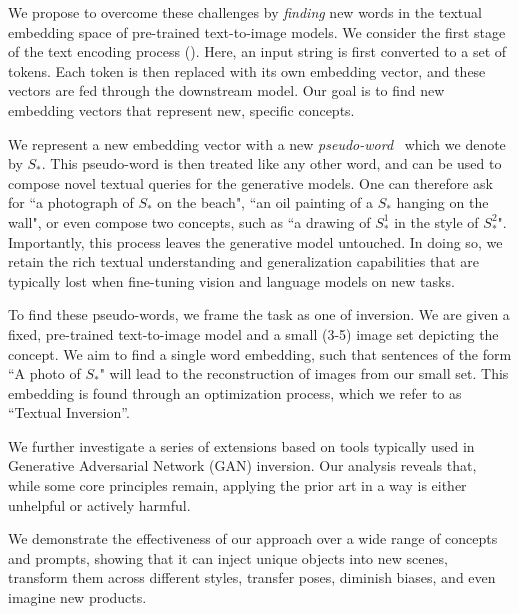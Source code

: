 We propose to overcome these challenges by \textit{finding} new words in the textual embedding space of pre-trained text-to-image models. We consider the first stage of the text encoding process (). Here, an input string is first converted to a set of tokens. Each token is then replaced with its own embedding vector, and these vectors are fed through the downstream model. Our goal is to find new embedding vectors that represent new, specific concepts.

We represent a new embedding vector with a new \textit{pseudo-word}~\citep{rathvon2004early} 
which we denote by $S_*$. This pseudo-word is then treated like any other word, and can be used to compose novel textual queries for the generative models. One can therefore ask for ``a photograph of $S_*$ on the beach", ``an oil painting of a $S_*$ hanging on the wall", or even compose two concepts, such as ``a drawing of $S^1_*$ in the style of $S^2_*$". Importantly, this process leaves the generative model untouched. In doing so, we retain the rich textual understanding and generalization capabilities that are typically lost when fine-tuning vision and language models on new tasks.

To find these pseudo-words, we frame the task as one of inversion. We are given a fixed, pre-trained text-to-image model and a small (3-5) image set depicting the concept. We aim to find a single word embedding, such that sentences of the form ``A photo of $S_*$" will lead to the reconstruction of images from our small set. This embedding is found through an optimization process, which we refer to as ``Textual Inversion''. 

We further investigate a series of extensions based on tools typically used in Generative Adversarial Network (GAN) inversion. Our analysis reveals that, while some core principles remain, applying the prior art in a \naive way is either unhelpful or actively harmful.

We demonstrate the effectiveness of our approach over a wide range of concepts and prompts, showing that it can inject unique objects into new scenes, transform them across different styles, transfer poses, diminish biases, and even imagine new products.

